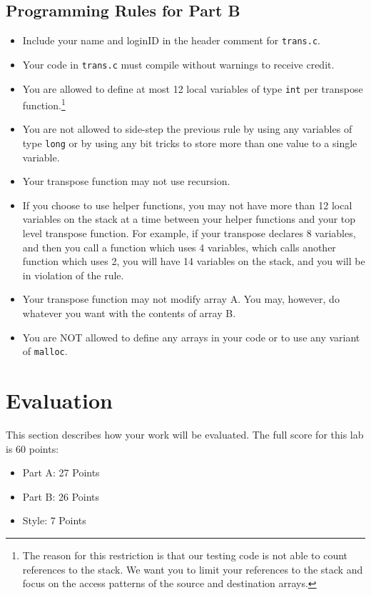 \documentclass[11pt]{article}
\begin{document}
\subsection*{Programming Rules for Part B}
\begin{itemize}
\item Include your name and loginID in the header comment for {\tt trans.c}.

\item Your code in {\tt trans.c} must compile without warnings to
  receive credit.

\item You are allowed to define at most 12 local variables of type
  \verb:int: per transpose function.\footnote{The reason for this
  restriction is that our testing code is not able to count references
  to the stack. We want you to limit your references to the stack and
  focus on the access patterns of the source and destination arrays.}

\item You are not allowed to side-step the previous rule by using any
  variables of type \verb:long: or by using any bit tricks to store more
  than one value to a single variable.

\item Your transpose function may not use recursion.

\item If you choose to use helper functions, you may not have more than 12
 local variables on the stack at a time between your helper functions and
 your top level transpose function. For example, if your transpose
 declares 8 variables, and then you call a function which uses 4
 variables, which calls another function which uses 2, you will have 
 14 variables on the stack, and you will be in violation of the rule.

\item Your transpose function may not modify array A. You may, however,
 do whatever you want with the contents of array B.

\item You are NOT allowed to define any arrays in your code or to use
  any variant of {\tt malloc}.

\end{itemize}

\section{Evaluation}
\label{sec:eval}
This section describes how your work will be evaluated. The full score
for this lab is 60 points:
\begin{itemize}
\item Part A: 27 Points 
\item Part B: 26 Points
\item Style: 7 Points
\end{itemize}
\end{document}
